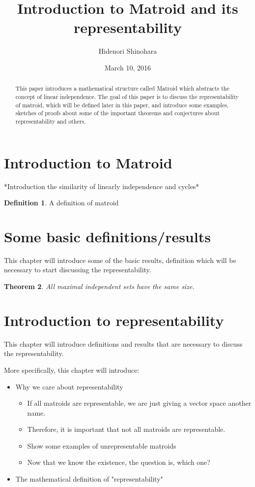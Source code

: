 \documentclass[psamsfonts]{amsart}
\title{Introduction to Matroid and its representability}
\author{Hidenori Shinohara}
\date{March 10, 2016}
\newtheorem{thm}{Theorem}[section]
\theoremstyle{definition}
\newtheorem{defn}[thm]{Definition}
\theoremstyle{remark}
\numberwithin{equation}{section}
\begin{document}
\begin{abstract}
This paper introduces a mathematical structure called Matroid which abstracts the concept of linear independence.
The goal of this paper is to discuss the representability of matroid, which will be defined later in this paper, and introduce some examples, sketches of proofs about some of the important theorems and conjectures about representability and others.

\end{abstract}

\maketitle

\tableofcontents

\section{Introduction to Matroid}

*Introduction the similarity of linearly independence and cycles*


\begin{defn}
A definition of matroid
\end{defn}


\section{Some basic definitions/results}

This chapter will introduce some of the basic results, definition which will be necessary to start discussing the representability.

\begin{thm}
All maximal independent sets have the same size.
\end{thm}

\section{Introduction to representability}

This chapter will introduce definitions and results that are necessary to discuss the representability.

More specifically, this chapter will introduce:
\begin{itemize}
\item Why we care about representability
  \begin{itemize}
  \item If all matroids are representable, we are just giving a vector space another name.
  \item Therefore, it is important that not all matroids are representable.
  \item Show some examples of unrepresentable matroids
  \item Now that we know the existence, the question is, which one?
  \end{itemize}
\item The mathematical definition of "representability"
\end{itemize}
\end{document}
